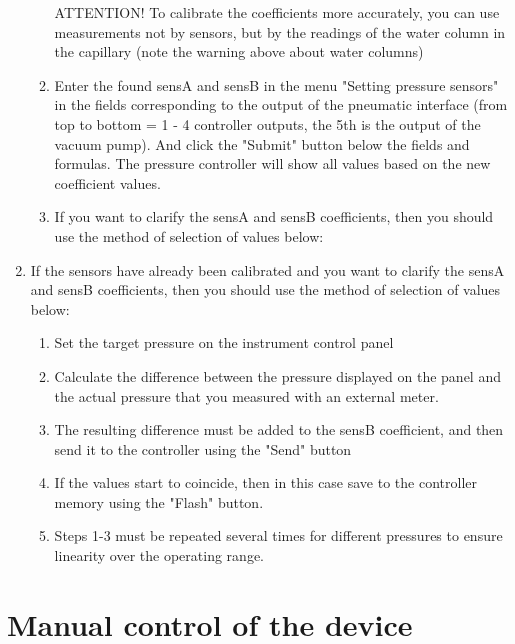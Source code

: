 \documentclass[twoside, 12pt, a4paper]{refart}
\begin{document}
\begin{enumerate}
\begin{enumerate}
ATTENTION! To calibrate the coefficients more accurately, you can use measurements not by sensors, but by the readings of the water column in the capillary (note the warning above about water columns)
            \item Enter the found sensA and sensB in the menu "Setting pressure sensors" in the fields corresponding to the output of the pneumatic interface (from top to bottom = 1 - 4 controller outputs, the 5th is the output of the vacuum pump). And click the "Submit" button below the fields and formulas. The pressure controller will show all values based on the new coefficient values.
            \item If you want to clarify the sensA and sensB coefficients, then you should use the method of selection of values below:
          \end{enumerate} 
        \item If the sensors have already been calibrated and you want to clarify the sensA and sensB coefficients, then you should use the method of selection of values below:
          \begin{enumerate} 
            \item Set the target pressure on the instrument control panel

            \item Calculate the difference between the pressure displayed on the panel and the actual pressure that you measured with an external meter.

            \item The resulting difference must be added to the sensB coefficient, and then send it to the controller using the "Send" button

            \item If the values start to coincide, then in this case save to the controller memory using the "Flash" button.

            \item Steps 1-3 must be repeated several times for different pressures to ensure linearity over the operating range.
            
          \end{enumerate}
      \end{enumerate}
        
   

  \newpage
  \section{Manual control of the device} 
  \label{usage}
\end{document}
